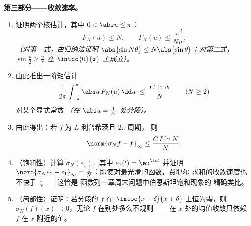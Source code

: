 \begin{problem}
\medskip
\noindent\textbf{第三部分——收敛速率。}
\begin{enumerate}[resume]
  \item 证明两个核估计，其中 $0 < \abs u \leq
        \pi$：
        \[
        F_N(u) \leq N,
        \qquad
        F_N(u) \leq \frac{\pi^2}{N u^2}
        \]
        \emph{（对第一式，由归纳法证明 $\abs{\sin N\theta} \leq
        N\abs{\sin\theta}$；对第二式，
        $\sin\frac u2 \geq \frac{u}{\pi}$ 在
        $\intcc{0}{\pi}$ 上成立）}。
  \item 由此推出一阶矩估计
        \[
        \frac{1}{2\pi}\int_{-\pi}^{\pi}\abs u\,F_N(u)\,\dd u
        \;\leq\; \frac{C\,\ln N}{N}
        \qquad (N \geq 2)
        \]
        对某个显式常数 \emph{（在 $\abs u =
        \frac1N$ 处分段）}。
  \item 由此得出：若 $f$ 为 $L$-利普希茨且 $2\pi$ 周期，
        则
        \[
        \norm{\sigma_N f - f}_\infty \leq \frac{C\,L\ln N}{N} .
        \]
  \item （饱和性）计算 $\sigma_N(e_1)$，其中 $e_1(t) =
        \eu^{\iu t}$ 并证明 $\norm{\sigma_Ne_1 - e_1}_\infty
        = \frac1N$：即使对最光滑的函数，费耶尔
        求和的收敛速度也不快于 $\frac1N$——这恰是
        函数列一章周末问题中伯恩斯坦饱和现象的
        精确类比。
  \item （局部性）证明：若分段的 $f$
        在 $\intoo{x - \delta}{x + \delta}$ 上恒为零，则
        $\sigma_N(f)(x) \to 0$，无论 $f$ 在别处多么不规则
——在 $x$ 处的均值收敛只依赖 $f$
        在 $x$ 附近的值。
\end{enumerate}


\end{problem}
